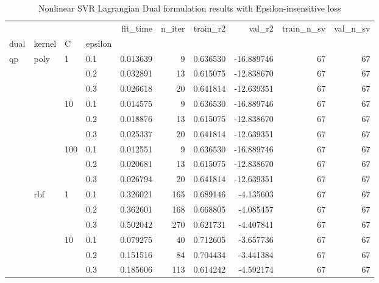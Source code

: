 \begin{table}[H]
\centering
\caption{Nonlinear SVR Lagrangian Dual formulation results with Epsilon-insensitive loss}
\label{nonlinear_lagrangian_dual_svr_cv_results}
\begin{tabular}{llllrrrrrr}
\toprule
     &     &     &     &  fit\_time &  n\_iter &  train\_r2 &     val\_r2 &  train\_n\_sv &  val\_n\_sv \\
dual & kernel & C & epsilon &           &         &           &            &             &           \\
\midrule
qp & poly & 1   & 0.1 &  0.013639 &       9 &  0.636530 & -16.889746 &          67 &        67 \\
     &     &     & 0.2 &  0.032891 &      13 &  0.615075 & -12.838670 &          67 &        67 \\
     &     &     & 0.3 &  0.026618 &      20 &  0.641814 & -12.639351 &          67 &        67 \\
     &     & 10  & 0.1 &  0.014575 &       9 &  0.636530 & -16.889746 &          67 &        67 \\
     &     &     & 0.2 &  0.018876 &      13 &  0.615075 & -12.838670 &          67 &        67 \\
     &     &     & 0.3 &  0.025337 &      20 &  0.641814 & -12.639351 &          67 &        67 \\
     &     & 100 & 0.1 &  0.012551 &       9 &  0.636530 & -16.889746 &          67 &        67 \\
     &     &     & 0.2 &  0.020681 &      13 &  0.615075 & -12.838670 &          67 &        67 \\
     &     &     & 0.3 &  0.026794 &      20 &  0.641814 & -12.639351 &          67 &        67 \\
     & rbf & 1   & 0.1 &  0.326021 &     165 &  0.689146 &  -4.135603 &          67 &        67 \\
     &     &     & 0.2 &  0.362601 &     168 &  0.668805 &  -4.085457 &          67 &        67 \\
     &     &     & 0.3 &  0.502042 &     270 &  0.621731 &  -4.407841 &          67 &        67 \\
     &     & 10  & 0.1 &  0.079275 &      40 &  0.712605 &  -3.657736 &          67 &        67 \\
     &     &     & 0.2 &  0.151516 &      84 &  0.704434 &  -3.441384 &          67 &        67 \\
     &     &     & 0.3 &  0.185606 &     113 &  0.614242 &  -4.592174 &          67 &        67 \\

\end{tabular}
\end{table}
